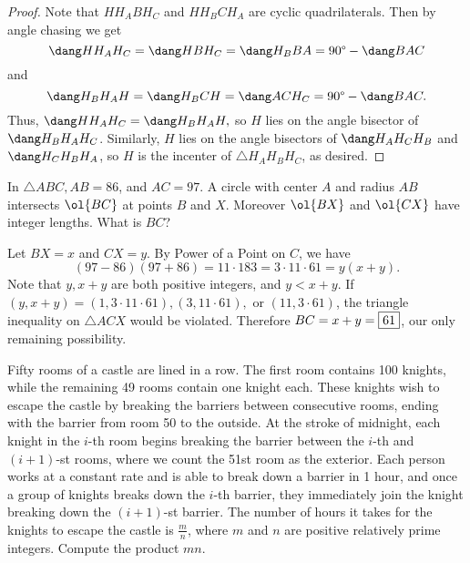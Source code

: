\documentclass[letterpaper,oneside]{scrartcl}
\begin{document}
\begin{proof}
  Note that \(HH_ABH_C\) and \(HH_BCH_A\) are cyclic quadrilaterals. Then by angle chasing we get
  \[\dang HH_AH_C = \dang HBH_C = \dang H_BBA = 90\degree - \dang BAC\]
  and
  \[\dang H_BH_AH = \dang H_BCH = \dang ACH_C = 90\degree - \dang BAC.\]
  Thus, \(\dang HH_AH_C = \dang H_BH_AH,\) so \(H\) lies on the angle bisector of \(\dang H_BH_AH_C\). Similarly, \(H\) lies on the angle bisectors of \(\dang H_AH_CH_B\) and \(\dang H_CH_BH_A\), so \(H\) is the incenter of \(\triangle H_AH_BH_C\), as desired.
\end{proof}
\newpage
\begin{problem*}
   In \(\triangle ABC, AB = 86\), and \(AC = 97\). A circle with center \(A\) and radius \(AB\) intersects \(\ol{BC}\) at points \(B\) and \(X\). Moreover \(\ol{BX}\) and \(\ol{CX}\) have integer lengths. What is \(BC\)?
\end{problem*}
\begin{soln}
  Let \(BX = x\) and \(CX = y\). By Power of a Point on \(C\), we have 
  \[(97-86)(97+86) = 11\cdot183 = 3\cdot11\cdot61=y(x+y).\]
  Note that \(y,x+y\) are both positive integers, and \(y<x+y\). If \((y,x+y) = (1,3\cdot11\cdot61),(3,11\cdot61),\) or \((11,3\cdot61)\), the triangle inequality on \(\triangle ACX\) would be violated. Therefore \(BC = x+y = \fbox{61}\), our only remaining possibility.
\end{soln}
\begin{problem*}
  Fifty rooms of a castle are lined in a row. The first room contains 100 knights, while the remaining 49 rooms contain one knight each. These knights wish to escape the castle by breaking the barriers between consecutive rooms, ending with the barrier from room 50 to the outside. At the stroke of midnight, each knight in the \(i\)-th room begins breaking the barrier between the \(i\)-th and \((i + 1)\)-st rooms, where we count the 51st room as the exterior. Each person works at a constant rate and is able to break down a barrier in 1 hour, and once a group of knights breaks down the \(i\)-th barrier, they immediately join the knight breaking down the \((i + 1)\)-st barrier. The number of hours it takes for the knights to escape the castle is \(\tfrac{m}{n}\), where \(m\) and \(n\) are positive relatively prime integers. Compute the product \(mn\).
\end{problem*}
\end{document}
